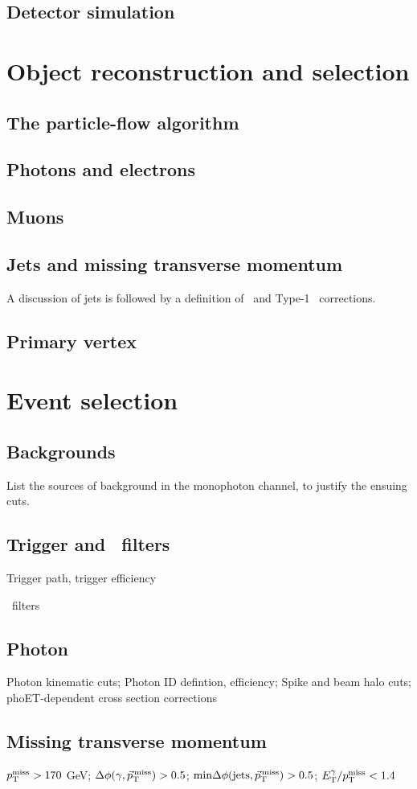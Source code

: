 \documentclass[oneside, letterpaper, 12pt, oldfontcommands]{memoir}
\begin{document}
\section{Detector simulation}

\chapter{Object reconstruction and selection}
\section{The particle-flow algorithm}
\section{Photons and electrons}
\section{Muons}
\section{Jets and missing transverse momentum}
A discussion of jets is followed by a definition of \MET\ and Type-1 \MET\ corrections.
\section{Primary vertex}

\chapter{Event selection}
\section{Backgrounds}
List the sources of background in the monophoton channel, to justify the ensuing cuts.
\section{Trigger and \MET\ filters}
Trigger path, trigger efficiency

\MET\ filters
\section{Photon}
Photon kinematic cuts; Photon ID defintion, efficiency; Spike and beam halo cuts; phoET-dependent cross section corrections
\section{Missing transverse momentum}
$p_\mathrm{T}^\mathrm{miss} > 170$ GeV; $\Delta\phi(\gamma,\vec{p}_\mathrm{T}^\mathrm{\,miss}) > 0.5$; $\mathrm{min}\Delta\phi(\mathrm{jets},\vec{p}_\mathrm{T}^\mathrm{\,miss}) > 0.5$;
$E_\mathrm{T}^{\gamma}/p_\mathrm{T}^\mathrm{miss} < 1.4$
\end{document}
